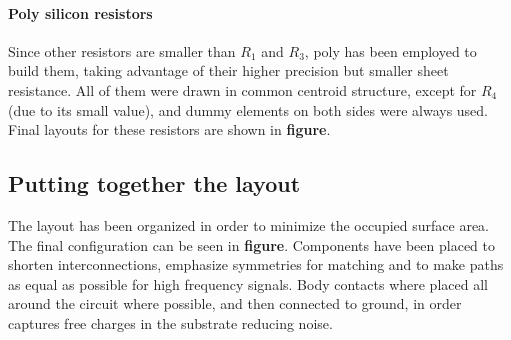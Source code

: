 \paragraph{Poly silicon resistors}
Since other resistors are smaller than \(R_1\) and \(R_3\), poly has been employed to build them, taking advantage of their higher precision but smaller sheet resistance. All of them were drawn in common centroid structure, except for \(R_4\) (due to its small value), and dummy elements on both sides were always used. Final layouts for these resistors are shown in \textbf{figure}. %

\subsection{Putting together the layout}
The layout has been organized in order to minimize the occupied surface area. The final configuration can be seen in \textbf{figure}. 
Components have been placed to shorten interconnections, emphasize symmetries for matching and to make paths as equal as possible for high frequency signals.
Body contacts where placed all around the circuit where possible, and then connected to ground, in order captures free charges in the substrate reducing noise.


